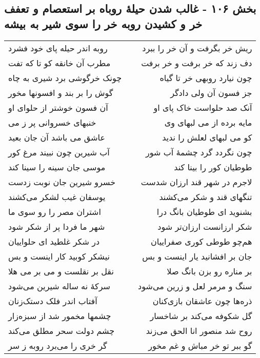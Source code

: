 \begin{center}
\section*{بخش ۱۰۶ - غالب شدن حیلهٔ روباه بر استعصام و تعفف خر و کشیدن روبه خر را سوی شیر به بیشه}
\label{sec:sh106}
\begin{longtable}{l p{0.5cm} r}
روبه اندر حیله پای خود فشرد
&&
ریش خر بگرفت و آن خر را ببرد
\\
مطرب آن خانقه کو تا که تفت
&&
دف زند که خر برفت و خر برفت
\\
چونک خرگوشی برد شیری به چاه
&&
چون نیارد روبهی خر تا گیاه
\\
گوش را بر بند و افسونها مخور
&&
جز فسون آن ولی دادگر
\\
آن فسون خوشتر از حلوای او
&&
آنک صد حلواست خاک پای او
\\
خنبهای خسروانی پر ز می
&&
مایه برده از می لبهای وی
\\
عاشق می باشد آن جان بعید
&&
کو می لبهای لعلش را ندید
\\
آب شیرین چون نبیند مرغ کور
&&
چون نگردد گرد چشمهٔ آب شور
\\
موسی جان سینه را سینا کند
&&
طوطیان کور را بینا کند
\\
خسرو شیرین جان نوبت زدست
&&
لاجرم در شهر قند ارزان شدست
\\
یوسفان غیب لشکر می‌کشند
&&
تنگهای قند و شکر می‌کشند
\\
اشتران مصر را رو سوی ما
&&
بشنوید ای طوطیان بانگ درا
\\
شهر ما فردا پر از شکر شود
&&
شکر ارزانست ارزان‌تر شود
\\
در شکر غلطید ای حلواییان
&&
هم‌چو طوطی کوری صفراییان
\\
نیشکر کوبید کار اینست و بس
&&
جان بر افشانید یار اینست و بس
\\
نقل بر نقلست و می بر می هلا
&&
بر مناره رو بزن بانگ صلا
\\
سرکهٔ نه ساله شیرین می‌شود
&&
سنگ و مرمر لعل و زرین می‌شود
\\
آفتاب اندر فلک دستک‌زنان
&&
ذره‌ها چون عاشقان بازی‌کنان
\\
چشمها مخمور شد از سبزه‌زار
&&
گل شکوفه می‌کند بر شاخسار
\\
چشم دولت سحر مطلق می‌کند
&&
روح شد منصور انا الحق می‌زند
\\
گر خری را می‌برد روبه ز سر
&&
گو ببر تو خر مباش و غم مخور
\\
\end{longtable}
\end{center}
